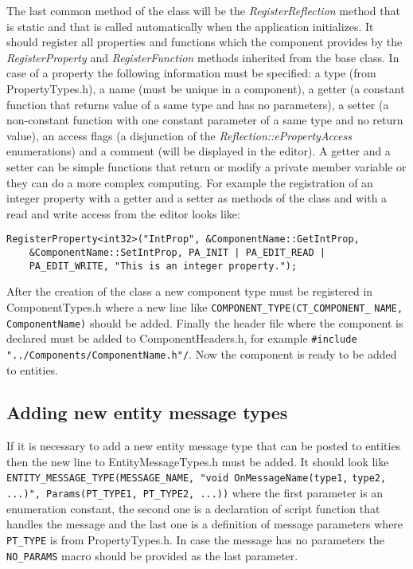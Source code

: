 The last common method of the class will be the \emph{RegisterReflection} me\-thod that is static and that is called automatically when the application initializes. It should register all properties and functions which the component provides by the \emph{RegisterProperty} and \emph{RegisterFunction} methods inherited from the base class. In case of a property the following information must be specified: a type (from PropertyTypes.h), a name (must be unique in a component), a getter (a constant function that returns value of a same type and has no parameters), a setter (a non-constant function with one constant parameter of a same type and no return value), an access flags (a disjunction of the \emph{Reflection::ePropertyAccess} enumerations) and a comment (will be displayed in the editor). A getter and a setter can be simple functions that return or modify a private member variable or they can do a more complex computing. For example the registration of an integer property with a getter and a setter as methods of the class and with a read and write access from the editor looks like:
\begin{verbatim}
RegisterProperty<int32>("IntProp", &ComponentName::GetIntProp,
    &ComponentName::SetIntProp, PA_INIT | PA_EDIT_READ |
    PA_EDIT_WRITE, "This is an integer property.");
\end{verbatim}

After the creation of the class a new component type must be registered in ComponentTypes.h where a new line like \verb/COMPONENT_TYPE(CT_COMPONENT_/ \verb/NAME, ComponentName)/ should be added. Finally the header file where the component is declared must be added to ComponentHeaders.h, for example \verb|#include "../Components/ComponentName.h"/|. Now the component is ready to be added to entities.

\subsection{Adding new entity message types}
\label{sub:entity-newmessages}

If it is necessary to add a new entity message type that can be posted to entities then the new line to EntityMessageTypes.h must be added. It should look like \verb/ENTITY_MESSAGE_TYPE(MESSAGE_NAME, "void OnMessageName(type1,/
\verb/type2, ...)", Params(PT_TYPE1, PT_TYPE2, ...))/ where the first parameter is an enumeration constant, the second one is a declaration of script function that handles the message and the last one is a definition of message parameters where \verb/PT_TYPE/ is from PropertyTypes.h. In case the message has no parameters the \verb/NO_PARAMS/ macro should be provided as the last parameter.

